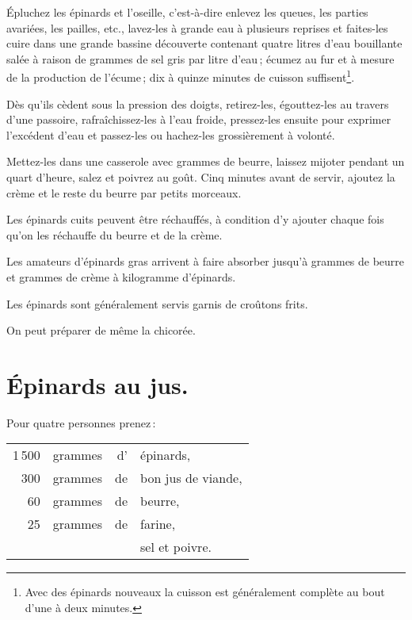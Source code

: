 Épluchez les épinards et l'oseille, c'est-à-dire enlevez les queues, les
parties avariées, les pailles, etc., lavez-les à grande eau à plusieurs
reprises et faites-les cuire dans une grande bassine découverte contenant
quatre litres d'eau bouillante salée à raison de {\mmm} grammes de sel
gris par litre d'eau ; écumez au fur et à mesure de la production de l'écume ;
dix à quinze minutes de cuisson suffisent\footnote{Avec des épinards nouveaux
la cuisson est généralement complète au bout d'une à deux minutes.}.

Dès qu'ils cèdent sous la pression des doigts, retirez-les, égouttez-les au
travers d'une passoire, rafraîchissez-les à l'eau froide, pressez-les ensuite
pour exprimer l'excédent d'eau et passez-les ou hachez-les grossièrement
à volonté.

Mettez-les dans une casserole avec {\mmm} grammes de beurre, laissez
mijoter pendant un quart d'heure, salez et poivrez au goût. Cinq minutes avant
de servir, ajoutez la crème et le reste du beurre par petits morceaux.

Les épinards cuits peuvent être réchauffés, à condition d'y ajouter chaque fois
qu'on les réchauffe du beurre et de la crème.

Les amateurs d'épinards gras arrivent à faire absorber jusqu'à {\mmm}
grammes de beurre et {\mmm} grammes de crème à {\mmm} kilogramme
d'épinards.

Les épinards sont généralement servis garnis de croûtons frits.

\sk

On peut préparer de même la chicorée.

\section*{\centering Épinards au jus.}
{}

Pour quatre personnes prenez :

\footnotesize
\begin{longtable}{rrrp{16em}}
  1 500 & grammes & d' & épinards,                                                                        \\
    300 & grammes & de & bon jus de viande,                                                               \\
     60 & grammes & de & beurre,                                                                          \\
     25 & grammes & de & farine,                                                                          \\
        &         &    & sel et poivre.                                                                   \\
\end{longtable}
\normalsize

